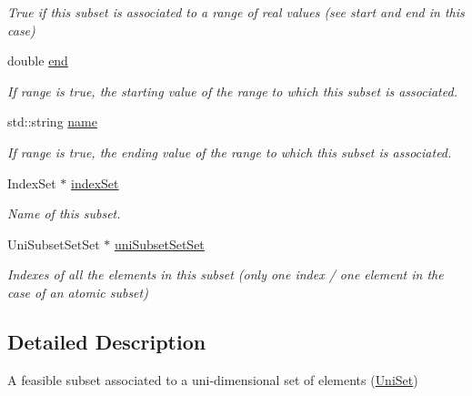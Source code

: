 \begin{DoxyCompactItemize}
\begin{DoxyCompactList}\small\item\em True if this subset is associated to a range of real values (see start and end in this case) \end{DoxyCompactList}\item 
\hypertarget{classUniSubset_a05f26ad45250f4adba9dc4eae35d3f72}{double \hyperlink{classUniSubset_a05f26ad45250f4adba9dc4eae35d3f72}{end}}\label{classUniSubset_a05f26ad45250f4adba9dc4eae35d3f72}

\begin{DoxyCompactList}\small\item\em If range is true, the starting value of the range to which this subset is associated. \end{DoxyCompactList}\item 
\hypertarget{classUniSubset_accf967a0475f78b1998fa3aaa2a6ae8e}{std\-::string \hyperlink{classUniSubset_accf967a0475f78b1998fa3aaa2a6ae8e}{name}}\label{classUniSubset_accf967a0475f78b1998fa3aaa2a6ae8e}

\begin{DoxyCompactList}\small\item\em If range is true, the ending value of the range to which this subset is associated. \end{DoxyCompactList}\item 
\hypertarget{classUniSubset_a32f7ed1b58639b5184c7c0321b08e6a1}{Index\-Set $\ast$ \hyperlink{classUniSubset_a32f7ed1b58639b5184c7c0321b08e6a1}{index\-Set}}\label{classUniSubset_a32f7ed1b58639b5184c7c0321b08e6a1}

\begin{DoxyCompactList}\small\item\em Name of this subset. \end{DoxyCompactList}\item 
\hypertarget{classUniSubset_a00491b5c614c9f1a548bec0a9e8aad4f}{Uni\-Subset\-Set\-Set $\ast$ \hyperlink{classUniSubset_a00491b5c614c9f1a548bec0a9e8aad4f}{uni\-Subset\-Set\-Set}}\label{classUniSubset_a00491b5c614c9f1a548bec0a9e8aad4f}

\begin{DoxyCompactList}\small\item\em Indexes of all the elements in this subset (only one index / one element in the case of an atomic subset) \end{DoxyCompactList}\end{DoxyCompactItemize}


\subsection{Detailed Description}
A feasible subset associated to a uni-\/dimensional set of elements (\hyperlink{classUniSet}{Uni\-Set}) 

